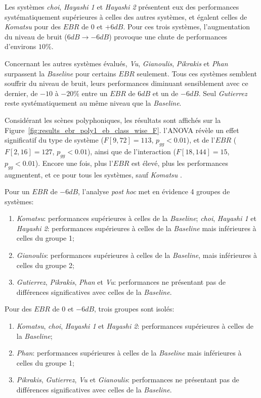 
Les systèmes \emph{choi}, \emph{Hayashi 1} et \emph{Hayashi 2} présentent eux des performances systématiquement supérieures à celles des autres systèmes, et égalent celles de \emph{Komatsu} pour des $EBR$ de $0$ et $+6dB$. Pour ces trois systèmes, l'augmentation du niveau de bruit ($6dB\rightarrow -6dB$) provoque une chute de performances d'environs $10\%$.

Concernant les autres systèmes évalués, \emph{Vu}, \emph{Gianoulis}, \emph{Pikrakis} et \emph{Phan} surpassent la \emph{Baseline} pour certains $EBR$ seulement. Tous ces systèmes semblent souffrir du niveau de bruit, leurs performances diminuant sensiblement avec ce dernier, de $-10$ à $-20\%$ entre un $EBR$ de $6dB$ et un de $-6dB$. Seul \emph{Gutierrez} reste systématiquement au même niveau que la \emph{Baseline}.

Considérant les scènes polyphoniques, les résultats sont affichés sur la Figure~\ref{fig:results_ebr_poly1_eb_class_wise_F}. l'ANOVA révèle un effet significatif du type de système ($F[9,72]=113$, $p_{gg}<0.01$), et de l'$EBR$ ($F[2,16]=127$, $p_{gg}<0.01$), ainsi que de l'interaction ($F[18,144]=15$, $p_{gg}<0.01$). Encore une fois, plus l'$EBR$ est élevé, plus les performances augmentent, et ce pour tous les systèmes, sauf \emph{Komatsu} .

Pour un $EBR$ de $-6dB$, l'analyse \emph{post hoc} met en évidence 4 groupes de systèmes:

\begin{enumerate}
\item \emph{Komatsu}: performances supérieures à celles de la \emph{Baseline};
\emph{choi}, \emph{Hayashi 1} et \emph{Hayashi 2}: performances supérieures à celles de la \emph{Baseline} mais inférieures à celles du groupe 1;
\item \emph{Gianoulis}: performances supérieures à celles de la \emph{Baseline}, mais inférieures à celles du groupe 2;
\item \emph{Gutierrez}, \emph{Pikrakis}, \emph{Phan} et \emph{Vu}: performances ne présentant pas de différences significatives avec celles de la \emph{Baseline}.
\end{enumerate}

Pour des $EBR$ de $0$ et $-6dB$, trois groupes sont isolés: 

\begin{enumerate}
\item \emph{Komatsu}, \emph{choi}, \emph{Hayashi 1} et \emph{Hayashi 2}: performances supérieures à celles de la \emph{Baseline};
\item \emph{Phan}: performances supérieures à celles de la \emph{Baseline} mais inférieures à celles du groupe 1;
\item \emph{Pikrakis}, \emph{Gutierrez}, \emph{Vu} et \emph{Gianoulis}: performances ne présentant pas de différences significatives avec celles de la \emph{Baseline}.
\end{enumerate}

